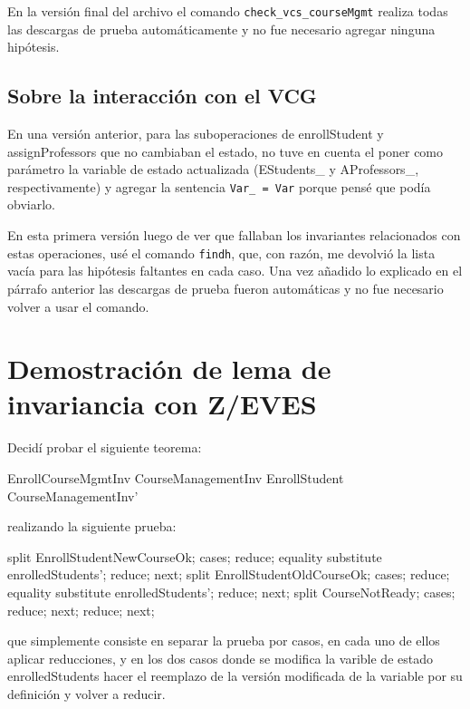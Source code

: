 \documentclass{article}
\begin{document}
En la versión final del archivo el comando \verb|check_vcs_courseMgmt| realiza todas las descargas de prueba automáticamente y no fue necesario agregar ninguna hipótesis.

\subsection*{Sobre la interacción con el VCG}

En una versión anterior, para las suboperaciones de enrollStudent y assignProfessors que no cambiaban el estado, no tuve en cuenta el poner como parámetro la variable de estado actualizada (EStudents\_ y AProfessors\_, respectivamente) y agregar la sentencia \verb|Var_ = Var| porque pensé que podía obviarlo.

En esta primera versión luego de ver que fallaban los invariantes relacionados con estas operaciones, usé el comando \verb|findh|, que, con razón, me devolvió la lista vacía para las hipótesis faltantes en cada caso. Una vez añadido lo explicado en el párrafo anterior las descargas de prueba fueron automáticas y no fue necesario volver a usar el comando.

\section*{Demostración de lema de invariancia con Z/EVES}

Decidí probar el siguiente teorema:

\begin{theorem}{EnrollCourseMgmtInv}
CourseManagementInv \land EnrollStudent \implies CourseManagementInv'
\end{theorem}

realizando la siguiente prueba:

\begin{zproof}[EnrollCourseMgmtInv]
    split EnrollStudentNewCourseOk;
    cases;
    reduce;
    equality substitute enrolledStudents';
    reduce;
    next;
    split EnrollStudentOldCourseOk;
    cases;
    reduce;
    equality substitute enrolledStudents';
    reduce;
    next;
    split CourseNotReady;
    cases;
    reduce;
    next;
    reduce;
    next;
\end{zproof}

que simplemente consiste en separar la prueba por casos, en cada uno de ellos aplicar reducciones, y en los dos casos donde se modifica la varible de estado enrolledStudents hacer el reemplazo de la versión modificada de la variable por su definición y volver a reducir.
\end{document}
